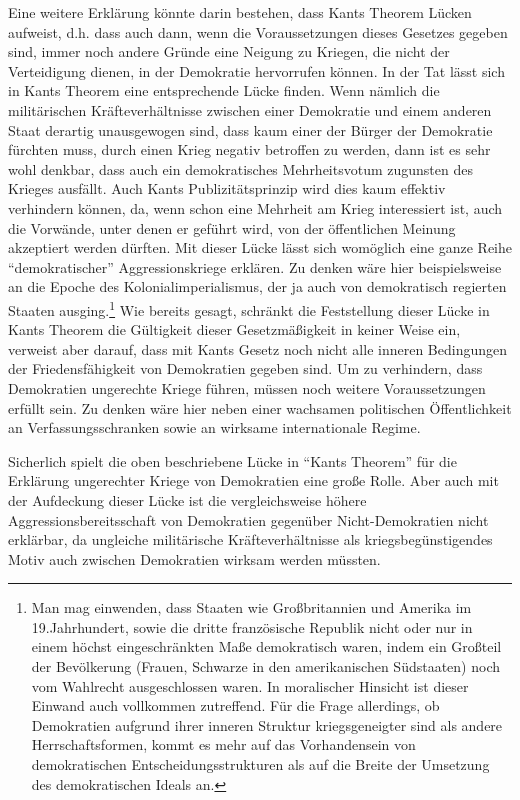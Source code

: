 \documentclass[12pt,a4paper,ngerman]{article}
\begin{document}
Eine weitere Erklärung könnte darin bestehen, dass Kants
Theorem Lücken aufweist, d.h. dass auch dann, wenn die
Voraussetzungen dieses Gesetzes gegeben sind, immer noch andere Gründe
eine Neigung zu Kriegen, die nicht der Verteidigung dienen, in der
Demokratie hervorrufen können. In der Tat lässt sich in Kants
Theorem eine entsprechende Lücke finden. Wenn nämlich die
militärischen Kräfteverhältnisse zwischen einer Demokratie und einem
anderen Staat derartig unausgewogen sind, dass kaum einer der Bürger
der Demokratie fürchten muss, durch einen Krieg negativ betroffen zu
werden, dann ist es sehr wohl denkbar, dass auch ein demokratisches
Mehrheitsvotum zugunsten des Krieges ausfällt. Auch Kants
Publizitätsprinzip wird dies kaum effektiv verhindern können, da, wenn
schon eine Mehrheit am Krieg interessiert ist, auch die Vorwände,
unter denen er geführt wird, von der öffentlichen Meinung akzeptiert
werden dürften. Mit dieser Lücke lässt sich womöglich eine ganze Reihe
"`demokratischer"' Aggressionskriege erklären. Zu denken wäre hier
beispielsweise an die Epoche des Kolonialimperialismus, der ja auch
von demokratisch regierten Staaten ausging.\footnote{Man mag
  einwenden, dass Staaten wie Großbritannien und Amerika im
  19.Jahrhundert, sowie die dritte französische Republik nicht oder
  nur in einem höchst eingeschränkten Maße demokratisch waren, indem
  ein Großteil der Bevölkerung (Frauen, Schwarze in den amerikanischen
  Südstaaten) noch vom Wahlrecht ausgeschlossen waren. In moralischer
  Hinsicht ist dieser Einwand auch vollkommen zutreffend. Für die
  Frage allerdings, ob Demokratien aufgrund ihrer inneren Struktur
  kriegsgeneigter sind als andere Herrschaftsformen, kommt es mehr auf
  das Vorhandensein von demokratischen Entscheidungsstrukturen als auf
  die Breite der Umsetzung des demokratischen Ideals an.} Wie bereits
gesagt, schränkt die Feststellung dieser Lücke in Kants Theorem die
Gültigkeit dieser Gesetzmäßigkeit in keiner Weise ein, verweist aber
darauf, dass mit Kants Gesetz noch nicht alle inneren Bedingungen der
Friedensfähigkeit von Demokratien gegeben sind. Um zu verhindern, dass
Demokratien ungerechte Kriege führen, müssen noch weitere
Voraussetzungen erfüllt sein. Zu denken wäre hier neben einer
wachsamen politischen Öffentlichkeit an Verfassungsschranken sowie an
wirksame internationale Regime.

Sicherlich spielt die oben beschriebene Lücke in "`Kants Theorem"' für
die Erklärung ungerechter Kriege von Demokratien eine große Rolle.
Aber auch mit der Aufdeckung dieser Lücke ist die vergleichsweise
höhere Aggressionsbereitsschaft von Demokratien gegenüber
Nicht-Demokratien nicht erklärbar, da ungleiche militärische
Kräfteverhältnisse als kriegsbegünstigendes Motiv auch zwischen
Demokratien wirksam werden müssten.
\end{document}

